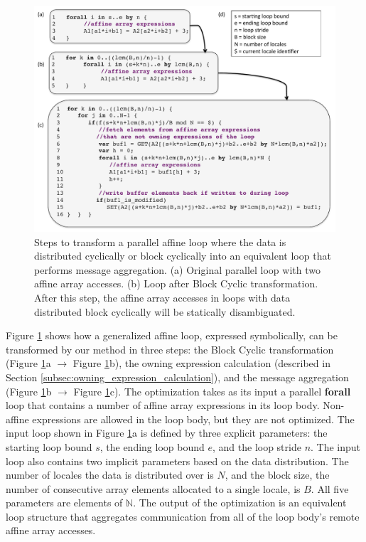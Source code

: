 \begin{figure}
	\begin{center}
	\includegraphics[scale=0.41]{./Figures/transformations}
	\caption{Steps to transform a parallel affine loop where the data is distributed cyclically or block cyclically into an equivalent loop that performs message aggregation. (a) Original parallel loop with two affine array accesses. (b) Loop after Block Cyclic transformation. After this step, the affine array accesses in loops with data distributed block cyclically will be statically disambiguated. }
	\label{transformations}
	\end{center}
\end{figure}

Figure \ref{transformations} shows how a generalized affine loop, expressed symbolically, can be transformed by our method in three steps: the Block Cyclic transformation (Figure \ref{transformations}a $\rightarrow$ Figure \ref{transformations}b), the owning expression calculation (described in Section \ref{subsec:owning_expression_calculation}), and the message aggregation (Figure \ref{transformations}b $\rightarrow$ Figure \ref{transformations}c). The optimization takes as its input a parallel \textbf{forall} loop that contains a number of affine array expressions in its loop body. Non-affine expressions are allowed in the loop body, but they are not optimized. The input loop shown in Figure \ref{transformations}a is defined by three explicit parameters: the starting loop bound $s$, the ending loop bound $e$, and the loop stride $n$. The input loop also contains two implicit parameters based on the data distribution. The number of locales the data is distributed over is $N$, and the block size, the number of consecutive array elements allocated to a single locale, is $B$. All five parameters are elements of $\mathbb{N}$. The output of the optimization is an equivalent loop structure that aggregates communication from all of the loop body's remote affine array accesses.


